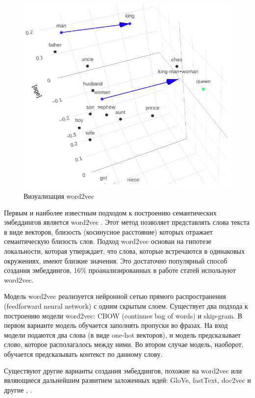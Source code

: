 \begin{figure}[h]
    \centering
    \includegraphics[width=\linewidth]{images/word2vec-demo.png}
    \caption{Визуализация word2vec \cite{word2vec-demo}}
    \label{img:word2vec-demo}
\end{figure}

Первым и наиболее известным подходом к построению семантических эмбеддингов является word2vec \cite{word2vec}. Этот метод позволяет представлять слова текста в виде векторов, близость (косинусное расстояние) которых отражает семантическую близость слов. Подход word2vec основан на гипотезе локальности, которая утверждает, что слова, которые встречаются в одинаковых окружениях, имеют близкие значения. Это достаточно популярный способ создания эмбеддингов, 16\% проанализированных в работе \cite{no-patterns} статей используют word2vec.

Модель word2vec реализуется нейронной сетью прямого распространения (feedforward neural network) с одним скрытым слоем. Существует два подхода к построению модели word2vec: CBOW (continues bag of words) и skip-gram. В первом варианте модель обучается заполнять пропуски во фразах. На вход модели подаются два слова (в виде one-hot векторов), и модель предсказывает слово, которое располагалось между ними. Во втором случае модель, наоборот, обучается предсказывать контекст по данному слову.

Существуют другие варианты создания эмбеддингов, похожие на word2vec или являющиеся дальнейшим развитием заложенных идей: GloVe, fastText, doc2vec и другие \cite{no-patterns}, \cite{embeddings-habr}.

